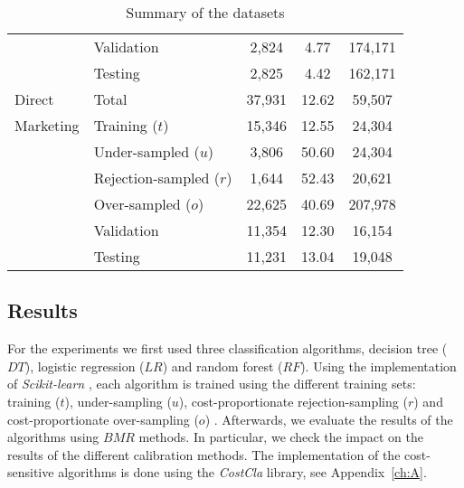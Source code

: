 \begin{table}
\begin{tabular}{l l c c c }
    &Validation&2,824&4.77&174,171\\
    &Testing&2,825&4.42&162,171\\
    \hline
    Direct &Total&37,931&12.62&59,507\\
    Marketing&Training ($t$)&15,346&12.55&24,304\\
    &Under-sampled ($u$)&3,806&50.60&24,304\\
    &Rejection-sampled ($r$)&1,644&52.43&20,621\\
    &Over-sampled ($o$)&22,625&40.69&207,978\\
    &Validation&11,354&12.30&16,154\\
    &Testing&11,231&13.04&19,048\\
    \hline
  \end{tabular}
  \caption{Summary of the datasets}
  \label{tab:6:databases}
\end{table}
 

\subsection{Results}


  For the experiments we first used three classification algorithms, decision tree ($DT$), logistic 
  regression ($LR$) and random forest ($RF$). Using the implementation of \textit{Scikit-learn} 
  \citep{Pedregosa2011}, each algorithm is trained using the different training sets: training 
  ($t$), under-sampling ($u$), cost-proportionate rejection-sampling  ($r$) \citep{Zadrozny2003}   
  and   cost-proportionate over-sampling ($o$) \citep{Elkan2001}. Afterwards,  we evaluate the 
  results of  the algorithms using $BMR$ methods. In particular, we   check the impact on the 
  results of the different calibration methods. The implementation of the cost-sensitive algorithms 
  is done using the \textit{CostCla} library, see Appendix~\ref{ch:A}.
  
